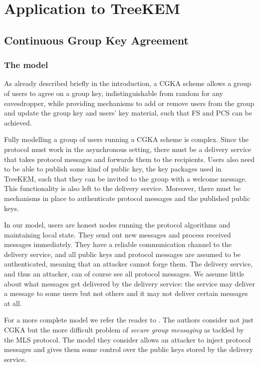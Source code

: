 \section{Application to TreeKEM}

\subsection{Continuous Group Key Agreement}

\subsubsection{The model}

As already described briefly in the introduction, a CGKA scheme allows a group of users to agree on a group key, indistinguishable from random for any eavesdropper, while providing mechanisms to add or remove users from the group and update the group key and users' key material, such that FS and PCS can be achieved.

Fully modelling a group of users running a CGKA scheme is complex. Since the protocol must work in the asynchronous setting, there must be a delivery service that takes protocol messages and forwards them to the recipients. Users also need to be able to publish some kind of public key, the key packages used in TreeKEM, such that they can be invited to the group with a welcome message. This functionality is also left to the delivery service. Moreover, there must be mechanisms in place to authenticate protocol messages and the published public keys.

In our model, users are honest nodes running the protocol algorithms and maintaining local state. They send out new messages and process received messages immediately. They have a reliable communication channel to the delivery service, and all public keys and protocol messages are assumed to be authenticated, meaning that an attacker cannot forge them. The delivery service, and thus an attacker, can of course see all protocol messages. We assume little about what messages get delivered by the delivery service: the service may deliver a message to some users but not others and it may not deliver certain messages at all.

For a more complete model we refer the reader to \cite{modular-group-messaging}. The authors consider not just CGKA but the more difficult problem of \emph{secure group messaging} as tackled by the MLS protocol. The model they consider allows an attacker to inject protocol messages and gives them some control over the public keys stored by the delivery service.

